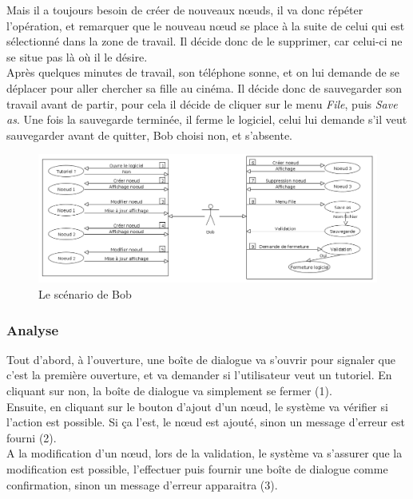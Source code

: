 \documentclass[12pt, a4paper]{article}
\begin{document}
Mais il a toujours besoin de créer de nouveaux nœuds, il va donc répéter l'opération, et remarquer que le nouveau nœud se place à la suite de celui qui est sélectionné dans la zone de travail. Il décide donc de le supprimer, car celui-ci ne se situe pas là où il le désire.\\


Après quelques minutes de travail, son téléphone sonne, et on lui demande de se déplacer pour aller chercher sa fille au cinéma. Il décide donc de sauvegarder son travail avant de partir, pour cela il décide de cliquer sur le menu \emph{File}, puis \emph{Save as}. Une fois la sauvegarde terminée, il ferme le logiciel, celui lui demande s’il veut sauvegarder avant de quitter, Bob choisi non, et s'absente.\\

\newpage
\begin{figure}[h]
\begin{center}
   \includegraphics[scale = 0.43]{scenario-bob.png}
	\caption{Le scénario de Bob}
	\end{center}
\end{figure}

\textcolor{NavyBlue}{\subsubsection{Analyse}}

Tout d'abord, à l'ouverture, une boîte de dialogue va s'ouvrir pour signaler que c'est la première ouverture, et va demander si l'utilisateur veut un tutoriel. En cliquant sur non, la boîte de dialogue va simplement se fermer (1).\\ 


Ensuite, en cliquant sur le bouton d'ajout d'un nœud, le système va vérifier si l'action est possible. Si ça l'est, le nœud est ajouté, sinon un message d'erreur est fourni (2).\\ 


A la modification d'un nœud, lors de la validation, le système va s'assurer que la modification est possible, l'effectuer puis fournir une boîte de dialogue comme confirmation, sinon un message d'erreur apparaitra (3).\\  
\end{document}
